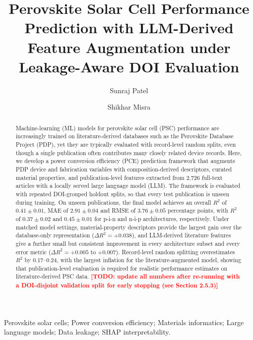\documentclass[3p]{elsarticle}
\newcommand{\authortodo}[1]{\textcolor{red}{\textbf{[TODO: #1]}}}
\begin{document}
\begin{frontmatter}

\title{Perovskite Solar Cell Performance Prediction with LLM-Derived Feature Augmentation under Leakage-Aware DOI Evaluation}

\author[1]{Sunraj Patel}
\author[1]{Shikhar Misra}


\address[1]{Department of Materials Science and Engineering, Indian Institute of Technology Kanpur, India 208016}


\begin{abstract}
Machine-learning (ML) models for perovskite solar cell (PSC) performance are increasingly trained on literature-derived databases such as the Perovskite Database Project (PDP), yet they are typically evaluated with record-level random splits, even though a single publication often contributes many closely related device records. Here, we develop a power conversion efficiency (PCE) prediction framework that augments PDP device and fabrication variables with composition-derived descriptors, curated material properties, and publication-level features extracted from 2,726 full-text articles with a locally served large language model (LLM). The framework is evaluated with repeated DOI-grouped holdout splits, so that every test publication is unseen during training. On unseen publications, the final model achieves an overall $R^2$ of $0.41 \pm 0.01$, MAE of $2.91 \pm 0.04$ and RMSE of $3.76 \pm 0.05$ percentage points, with $R^2$ of $0.37 \pm 0.02$ and $0.45 \pm 0.01$ for p-i-n and n-i-p architectures, respectively. Under matched model settings, material-property descriptors provide the largest gain over the database-only representation ($\Delta R^2 = +0.038$), and LLM-derived literature features give a further small but consistent improvement in every architecture subset and every error metric ($\Delta R^2 = +0.005$ to $+0.007$). Record-level random splitting overestimates $R^2$ by 0.17--0.24, with the largest inflation for the literature-augmented model, showing that publication-level evaluation is required for realistic performance estimates on literature-derived PSC data.
\authortodo{update all numbers after re-running with a DOI-disjoint validation split for early stopping (see Section 2.5.3)}
\end{abstract}

\begin{keyword}
Perovskite solar cells; Power conversion efficiency; Materials informatics; Large language models; Data leakage; SHAP interpretability.
\end{keyword}

\end{frontmatter}
\end{document}
